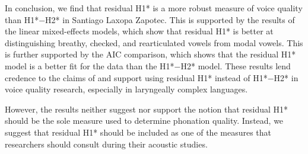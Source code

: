 In conclusion, we find that residual H1* is a more robust measure of voice quality than H1*$-$H2* in Santiago Laxopa Zapotec. This is supported by the results of the linear mixed-effects models, which show that residual H1* is better at distinguishing breathy, checked, and rearticulated vowels from modal vowels. This is further supported by the AIC comparison, which shows that the residual H1* model is a better fit for the data than the H1*$-$H2* model. These results lend credence to the claims of \citet{chaiH1H2AcousticMeasure2022} and support using residual H1* instead of H1*$-$H2* in voice quality research, especially in laryngeally complex languages.

However, the results neither suggest nor support the notion that residual H1* should be the sole measure used to determine phonation quality. Instead, we suggest that residual H1* should be included as one of the measures that researchers should consult during their acoustic studies. 